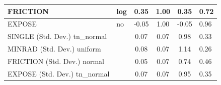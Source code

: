 \begin{table}
\begin{center}
\begin{tabular}{|l|l|c|c|c|l|}
			\hline
			FRICTION & log & 0.35 & 1.00 & 0.35 & 0.72 \\
			\hline
			EXPOSE & no & -0.05 & 1.00 & -0.05 & 0.96 \\
			\hline
			SINGLE (Std. Dev.) tn_normal &  & 0.07 & 0.07 & 0.98 & 0.33 \\
			\hline
			MINRAD (Std. Dev.) uniform &  & 0.08 & 0.07 & 1.14 & 0.26 \\
			\hline
			FRICTION (Std. Dev.) normal &  & 0.05 & 0.07 & 0.74 & 0.46 \\
			\hline
			EXPOSE (Std. Dev.) tn_normal &  & 0.07 & 0.07 & 0.95 & 0.35 \\
			\hline
		\end{tabular}
	\end{center}
\end{table}
